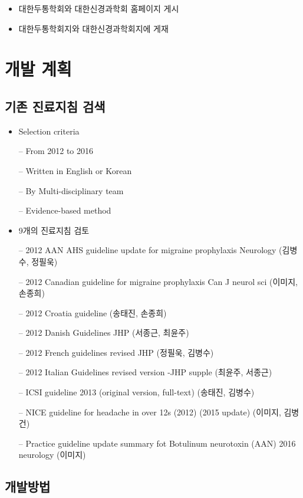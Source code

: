 \documentclass[]{book}
\providecommand{\tightlist}{%
  \setlength{\itemsep}{0pt}\setlength{\parskip}{0pt}}
\begin{document}
\begin{itemize}
\tightlist
\item
  대한두통학회와 대한신경과학회 홈페이지 게시
\item
  대한두통학회지와 대한신경과학회지에 게재
\end{itemize}

\hypertarget{section-11}{%
\chapter{개발 계획}\label{section-11}}

\hypertarget{section-12}{%
\section{기존 진료지침 검색}\label{section-12}}

\begin{itemize}
\item
  Selection criteria

  -- From 2012 to 2016

  -- Written in English or Korean

  -- By Multi-disciplinary team

  -- Evidence-based method
\item
  9개의 진료지침 검토

  -- 2012 AAN AHS guideline update for migraine prophylaxis Neurology (김병수, 정필욱)

  -- 2012 Canadian guideline for migraine prophylaxis Can J neurol sci (이미지, 손종희)

  -- 2012 Croatia guideline (송태진, 손종희)

  -- 2012 Danish Guidelines JHP (서종근, 최윤주)

  -- 2012 French guidelines revised JHP (정필욱, 김병수)

  -- 2012 Italian Guidelines revised version -JHP supple (최윤주, 서종근)

  -- ICSI guideline 2013 (original version, full-text) (송태진, 김병수)

  -- NICE guideline for headache in over 12s (2012) (2015 update) (이미지, 김병건)

  -- Practice guideline update summary fot Botulinum neurotoxin (AAN) 2016 neurology (이미지)
\end{itemize}

\hypertarget{section-13}{%
\section{개발방법}\label{section-13}}
\end{document}
